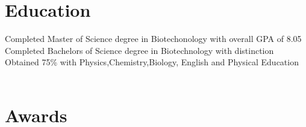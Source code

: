 \documentclass[letterpaper]{twentysecondcv} %
\begin{document}

\section{Education}

\begin{twenty} %
	{Completed Master of Science degree in Biotechonology with overall GPA of 8.05 }
	{Completed Bachelors of Science degree in Biotechnology with distinction}
	{Obtained 75\% with Physics,Chemistry,Biology, English and Physical Education\\\\ }
\end{twenty}

\iffalse
\section{Publications}

\begin{twentyshort} %
	\twentyitemshort{1865}{Chapter One, Down the Rabbit Hole.}
	\twentyitemshort{1865}{Chapter Two, The Pool of Tears.}
	\twentyitemshort{1865}{Chapter Three,  The Caucus Race and a Long Tale.}
	\twentyitemshort{1865}{Chapter Four,  The Rabbit Sends a Little Bill.}
	\twentyitemshort{1865}{Chapter Five,  Advice from a Caterpillar.}
\end{twentyshort}
\fi

\iffalse
\section{Awards}
\end{document}
